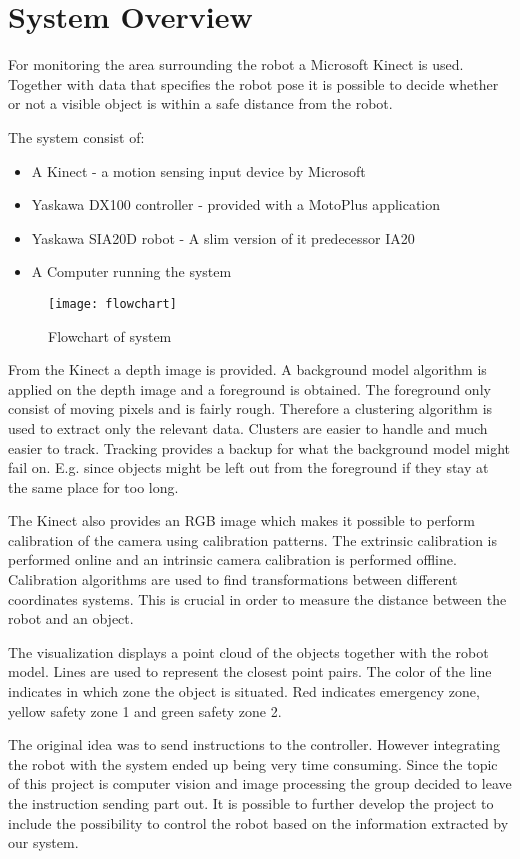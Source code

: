 
\section{System Overview}

For monitoring the area surrounding the robot a Microsoft Kinect is used. Together with data that specifies the robot pose it is possible to decide whether or not a visible object is within a safe distance from the robot.

The system consist of:
\begin{itemize}
\item A Kinect - a motion sensing input device by Microsoft
\item Yaskawa DX100 controller - provided with a MotoPlus application
\item Yaskawa SIA20D robot - A slim version of it predecessor IA20
\item A Computer running the system
\end{itemize}

\begin{figure}[H]
\begin{center}
\texttt{[image: flowchart]}
\caption{Flowchart of system}
\label{flowchart}
\end{center}
\end{figure}




From the Kinect a depth image is provided. A background model algorithm is applied on the depth image and a foreground is obtained. The foreground only consist of moving pixels and is fairly rough. Therefore a clustering algorithm is used to extract only the relevant data. Clusters are easier to handle and much easier to track. Tracking provides a backup for what the background model might fail on. E.g. since objects might be left out from the foreground if they stay at the same place for too long.

The Kinect also provides an RGB image which makes it possible to perform calibration of the camera using calibration patterns. The extrinsic calibration is performed online and an intrinsic camera calibration is performed offline. Calibration algorithms are used to find transformations between different coordinates systems. This is crucial in order to measure the distance between the robot and an object.

The visualization displays a point cloud of the objects together with the robot model. Lines are used to represent the closest point pairs. The color of the line indicates in which zone the object is situated. Red indicates emergency zone, yellow safety zone 1 and green safety zone 2.

The original idea was to send instructions to the controller. However integrating the robot with the system ended up being very time consuming. Since the topic of this project is computer vision and image processing the group decided to leave the instruction sending part out. It is possible to further develop the project to include the possibility to control the robot based on the information extracted by our system.


